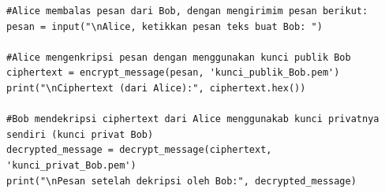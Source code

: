 \documentclass{article}
\begin{document}

\begin{verbatim}
#Alice membalas pesan dari Bob, dengan mengirimim pesan berikut:
pesan = input("\nAlice, ketikkan pesan teks buat Bob: ")

#Alice mengenkripsi pesan dengan menggunakan kunci publik Bob
ciphertext = encrypt_message(pesan, 'kunci_publik_Bob.pem')
print("\nCiphertext (dari Alice):", ciphertext.hex())

#Bob mendekripsi ciphertext dari Alice menggunakab kunci privatnya
sendiri (kunci privat Bob)
decrypted_message = decrypt_message(ciphertext, 'kunci_privat_Bob.pem')
print("\nPesan setelah dekripsi oleh Bob:", decrypted_message)
\end{verbatim}
\end{document}
